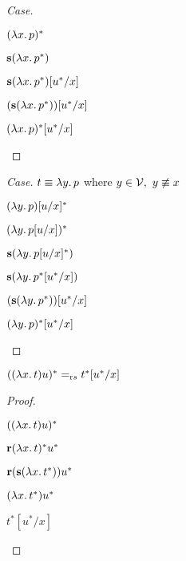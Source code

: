 \begin{prop}
\begin{proof}[Case]
\begin{itemize}
      \step[\equiv]
        $(\lambda x\ldotp p)^*$

      \step[\equiv]
        $\mathbf{s}(\lambda x\ldotp p^*)$
        \marginnote{\Def-$(-)^*$}

      \step[\equiv]
        $\mathbf{s}(\lambda x\ldotp p^*)[u^*/x]$

      \step[\equiv]
        $(\mathbf{s}(\lambda x\ldotp p^*))[u^*/x]$

      \step[\equiv]
        $(\lambda x\ldotp p)^*[u^*/x]$
        \marginnote{\Def-$(-)^*$}
        \qedhere
    \end{itemize}
  \end{proof}

  \begin{proof}[Case]
    $t\equiv\lambda y\ldotp p$ where $y\in\mathcal{V},~y\not\equiv x$
    \begin{itemize}
      \step
        $(\lambda y\ldotp p)[u/x]^*$

      \step[\equiv]
        $(\lambda y\ldotp p[u/x])^*$

      \step[\equiv]
        $\mathbf{s}(\lambda y\ldotp p[u/x]^*)$
        \marginnote{\Def-$(-)^*$}

      \step[\equiv]
        $\mathbf{s}(\lambda y\ldotp p^*[u^*/x])$

      \step[\equiv]
        $(\mathbf{s}(\lambda y\ldotp p^*))[u^*/x]$

      \step[\equiv]
        $(\lambda y\ldotp p)^*[u^*/x]$
        \marginnote{\Def-$(-)^*$}
        \qedhere
    \end{itemize}
  \end{proof}
\end{prop}

\begin{prop}
  $((\lambda x\ldotp t)u)^* =_{\text rs} t^*[u^*/x]$
  \begin{proof}
    \begin{itemize}
      \step
        $((\lambda x\ldotp t)u)^*$

      \step[\equiv]
        $\mathbf{r}(\lambda x\ldotp t)^*u^*$
        \marginnote{\Def-$(-)^*$}

      \step[\equiv]
        $\mathbf{r}(\mathbf{s}(\lambda x\ldotp t^*))u^*$
        \marginnote{\Def-$(-)^*$}

      \step[=_{\text rs}]
        $(\lambda x\ldotp t^*)u^*$

      \step[=_\beta]
        $t^*[u^*/x]$
        \marginnote{\Def-$=_\beta$}
        \qedhere
    \end{itemize}
  \end{proof}
\end{prop}

